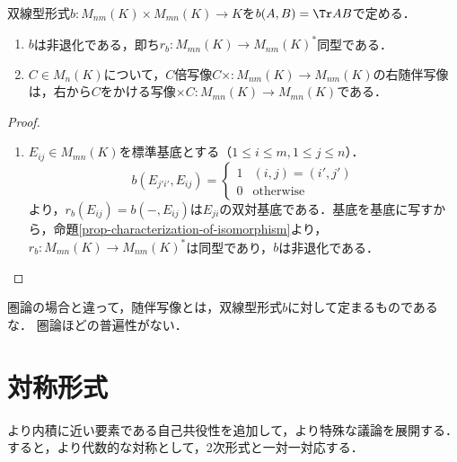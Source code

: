 \documentclass[uplatex, dvipdfmx]{jsreport}
\begin{document}
\begin{proposition}[随伴写像は行列の転置に当たる]
    双線型形式$b:M_{nm}(K)\times M_{mn}(K)\to K$を$b(A,B)=\Tr AB$で定める．
    \begin{enumerate}
        \item $b$は非退化である，即ち$r_b:M_{mn}(K)\to M_{nm}(K)^*$同型である．
        \item $C\in M_n(K)$について，$C$倍写像$C\times:M_{nm}(K)\to M_{nm}(K)$の右随伴写像は，右から$C$をかける写像$\times C:M_{mn}(K)\to M_{mn}(K)$である．
    \end{enumerate}
\end{proposition}
\begin{proof}\mbox{}
    \begin{enumerate}
        \item $E_{ij}\in M_{mn}(K)$を標準基底とする（$1\le i\le m,1\le j\le n$）．
        \[b(E_{j'i'},E_{ij})=\begin{cases}
            1&(i,j)=(i',j')\\
            0&\mathrm{otherwise}
        \end{cases}\]
        より，$r_b(E_{ij})=b(-,E_{ij})$は$E_{ji}$の双対基底である．基底を基底に写すから，命題\ref{prop-characterization-of-isomorphism}より，$r_b:M_{mn}(K)\to M_{nm}(K)^*$は同型であり，$b$は非退化である．

    \end{enumerate}
\end{proof}
\begin{remarks}
    圏論の場合と違って，随伴写像とは，双線型形式$b$に対して定まるものであるな．
    圏論ほどの普遍性がない．
\end{remarks}

\section{対称形式}

\begin{tcolorbox}[colframe=ForestGreen, colback=ForestGreen!10!white, breakable,
    title=単一空間上の双線型形式を考える]
    より内積に近い要素である自己共役性を追加して，より特殊な議論を展開する．
    すると，より代数的な対称として，2次形式と一対一対応する．
\end{tcolorbox}
\end{document}
